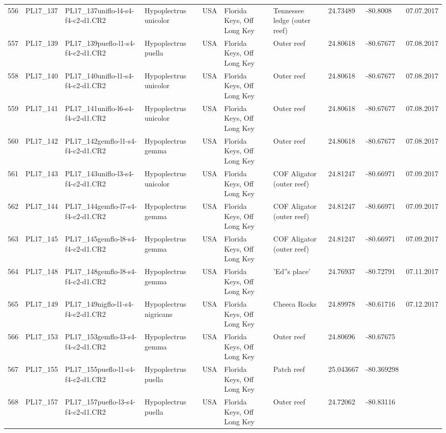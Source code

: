 \begin{table}[ht]
\begin{tabular}{rlllllllll}
  556 & PL17\_137 & PL17\_137uniflo-l4-s4-f4-c2-d1.CR2 & Hypoplectrus unicolor & USA & Florida Keys, Off Long Key & Tennessee ledge (outer reef) & 24.73489 & -80.8008 & 07.07.2017 \\ 
  557 & PL17\_139 & PL17\_139pueflo-l1-s4-f4-c2-d1.CR2 & Hypoplectrus puella & USA & Florida Keys, Off Long Key & Outer reef & 24.80618 & -80.67677 & 07.08.2017 \\ 
  558 & PL17\_140 & PL17\_140uniflo-l1-s4-f4-c2-d1.CR2 & Hypoplectrus unicolor & USA & Florida Keys, Off Long Key & Outer reef & 24.80618 & -80.67677 & 07.08.2017 \\ 
  559 & PL17\_141 & PL17\_141uniflo-l6-s4-f4-c2-d1.CR2 & Hypoplectrus unicolor & USA & Florida Keys, Off Long Key & Outer reef & 24.80618 & -80.67677 & 07.08.2017 \\ 
  560 & PL17\_142 & PL17\_142gemflo-l1-s4-f4-c2-d1.CR2 & Hypoplectrus gemma & USA & Florida Keys, Off Long Key & Outer reef & 24.80618 & -80.67677 & 07.08.2017 \\ 
  561 & PL17\_143 & PL17\_143uniflo-l3-s4-f4-c2-d1.CR2 & Hypoplectrus unicolor & USA & Florida Keys, Off Long Key & COF Aligator (outer reef) & 24.81247 & -80.66971 & 07.09.2017 \\ 
  562 & PL17\_144 & PL17\_144gemflo-l7-s4-f4-c2-d1.CR2 & Hypoplectrus gemma & USA & Florida Keys, Off Long Key & COF Aligator (outer reef) & 24.81247 & -80.66971 & 07.09.2017 \\ 
  563 & PL17\_145 & PL17\_145gemflo-l8-s4-f4-c2-d1.CR2 & Hypoplectrus gemma & USA & Florida Keys, Off Long Key & COF Aligator (outer reef) & 24.81247 & -80.66971 & 07.09.2017 \\ 
  564 & PL17\_148 & PL17\_148gemflo-l8-s4-f4-c2-d1.CR2 & Hypoplectrus gemma & USA & Florida Keys, Off Long Key & 'Ed''s place' & 24.76937 & -80.72791 & 07.11.2017 \\ 
  565 & PL17\_149 & PL17\_149nigflo-l1-s4-f4-c2-d1.CR2 & Hypoplectrus nigricans & USA & Florida Keys, Off Long Key & Cheeca Rocks & 24.89978 & -80.61716 & 07.12.2017 \\ 
  566 & PL17\_153 & PL17\_153gemflo-l3-s4-f4-c2-d1.CR2 & Hypoplectrus gemma & USA & Florida Keys, Off Long Key & Outer reef & 24.80696 & -80.67675 &  \\ 
  567 & PL17\_155 & PL17\_155pueflo-l1-s4-f4-c2-d1.CR2 & Hypoplectrus puella & USA & Florida Keys, Off Long Key & Patch reef & 25.043667 & -80.369298 &  \\ 
  568 & PL17\_157 & PL17\_157pueflo-l3-s4-f4-c2-d1.CR2 & Hypoplectrus puella & USA & Florida Keys, Off Long Key & Outer reef & 24.72062 & -80.83116 &  \\ 

\end{tabular}
\end{table}
